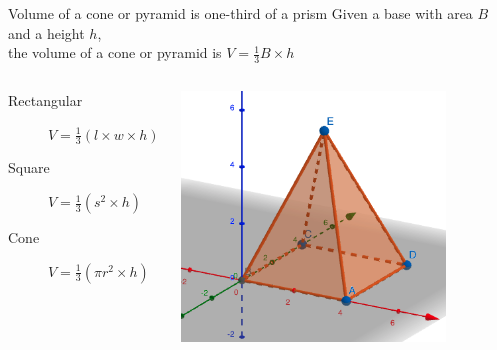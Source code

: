 \begin{frame}{Volume of a cone or pyramid is one-third of a prism} 
  Given a base with area $B$ and a height $h$, \\
  the volume of a cone or pyramid is $V= \frac{1}{3} B \times h$
  \vspace{0.5cm}
  \begin{columns}
    \begin{description}
      \item[Rectangular] $V= \frac{1}{3} (l \times w \times h)$
      \item[Square] $V= \frac{1}{3} (s^2 \times h)$
      \item[Cone] $V= \frac{1}{3} (\pi r^2 \times h)$ 
    \end{description}
    \includegraphics[width=0.8\textwidth]{../graphics/04pyramid.png}
  \end{columns} \vspace{0.5cm}
  \end{frame}

